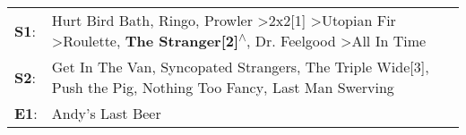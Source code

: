 \begin{supertabular}{p{0.03\textwidth}p{0.92\textwidth}}
 \textbf{S1}:  &  Hurt Bird Bath\textsuperscript{}, \enspace Ringo\textsuperscript{}, \enspace Prowler\textsuperscript{} \textgreater \enspace 2x2[1]\textsuperscript{} \textgreater \enspace Utopian Fir\textsuperscript{} \textgreater \enspace Roulette\textsuperscript{}, \enspace \textbf{The Stranger[2]\textsuperscript{$\wedge$}}, \enspace Dr. Feelgood\textsuperscript{} \textgreater \enspace All In Time\textsuperscript{}  \enspace  \\
 \textbf{S2}:  &                                                                                                                                                 Get In The Van\textsuperscript{}, \enspace Syncopated Strangers\textsuperscript{}, \enspace The Triple Wide[3]\textsuperscript{}, \enspace Push the Pig\textsuperscript{}, \enspace Nothing Too Fancy\textsuperscript{}, \enspace Last Man Swerving\textsuperscript{}  \enspace  \\
 \textbf{E1}:  &                                                                                                                                                                                                                                                                                                                                                                                    Andy's Last Beer\textsuperscript{}  \enspace  \\
\end{supertabular}
